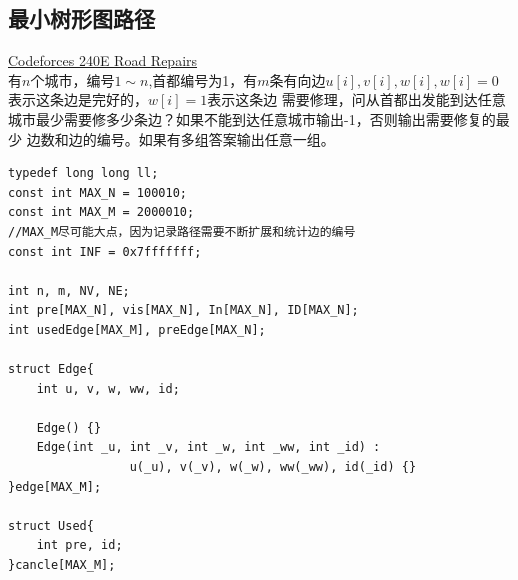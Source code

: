 \subsection{最小树形图路径}
\underline {Codeforces 240E Road Repairs} \\

有$n$个城市，编号$1\sim n$,首都编号为1，有$m$条有向边$u[i],v[i],w[i],w[i]=0$表示这条边是完好的，$w[i]=1$表示这条边 需要修理，问从首都出发能到达任意城市最少需要修多少条边？如果不能到达任意城市输出-1，否则输出需要修复的最少 边数和边的编号。如果有多组答案输出任意一组。
\begin{lstlisting}
typedef long long ll;
const int MAX_N = 100010;
const int MAX_M = 2000010;
//MAX_M尽可能大点，因为记录路径需要不断扩展和统计边的编号
const int INF = 0x7fffffff;

int n, m, NV, NE;
int pre[MAX_N], vis[MAX_N], In[MAX_N], ID[MAX_N];
int usedEdge[MAX_M], preEdge[MAX_N];

struct Edge{
    int u, v, w, ww, id;

    Edge() {}
    Edge(int _u, int _v, int _w, int _ww, int _id) :
                 u(_u), v(_v), w(_w), ww(_ww), id(_id) {}
}edge[MAX_M];

struct Used{
    int pre, id;
}cancle[MAX_M];



\end{lstlisting}

